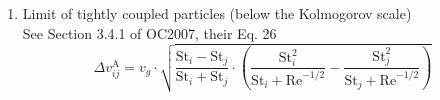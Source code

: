         \begin{enumerate}

            \item Limit of tightly coupled particles (below the Kolmogorov scale) \\
                See Section 3.4.1 of OC2007, their Eq. 26
                \begin{equation}
                    \Delta v_{ij}^\text{A}
                    = v_g \cdot \sqrt{
                        \frac{\text{St}_i - \text{St}_j}{\text{St}_i + \text{St}_j} \cdot 
                        \left(
                            \frac{\text{St}_i^2}{\text{St}_i + \text{Re}^{-1/2}} -
                            \frac{\text{St}_j^2}{\text{St}_j + \text{Re}^{-1/2}}
                        \right)
                    }
                \end{equation} 


\end{enumerate}
